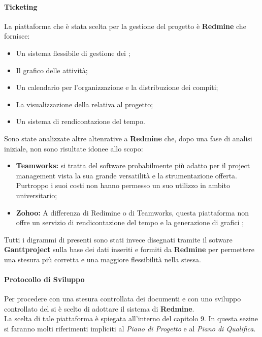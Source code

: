       \paragraph{Ticketing}
        La piattaforma che è stata scelta per la gestione del progetto è \textbf{Redmine} che fornisce:
        \begin{itemize}
          \item Un sistema flessibile di gestione dei ;
          \item Il grafico  delle attività;
          \item Un calendario per l'organizzazione e la distribuzione dei compiti;
          \item La visualizzazione della  relativa al progetto;
          \item Un sistema di rendicontazione del tempo.
        \end{itemize}
        Sono state analizzate altre altenrative a \textbf{Redmine} che, dopo una fase di analisi iniziale, non sono risultate idonee allo scopo:
        \begin{itemize}
          \item \textbf{Teamworks: }si tratta del software probabilmente più adatto per il project management vista la sua grande versatilità e
          la strumentazione offerta. Purtroppo i suoi costi non hanno permesso un suo utilizzo in ambito universitario;
          \item \textbf{Zohoo: }A differenza di Redimine o di Teamworks, questa piattaforma non offre un servizio di rendicontazione del tempo
          e la generazione di grafici ;
        \end{itemize}
        Tutti i digrammi di  presenti sono stati invece disegnati tramite il sotware \textbf{Ganttproject} sulla base dei dati inseriti e formiti da \textbf{Redmine}
        per permettere una stesura più corretta e una maggiore flessibilità nella stessa.
      \paragraph{Protocollo di Sviluppo}
        Per procedere con una stesura controllata dei documenti e con uno sviluppo controllato del  si è scelto di adottare
        il sistema di  \textbf{Redmine}.\\
        La scelta di tale piattaforma è spiegata all'interno del capitolo 9.
        In questa sezine si faranno molti riferimenti impliciti al \emph{Piano di Progetto} e al \emph{Piano di  Qualifica}.
